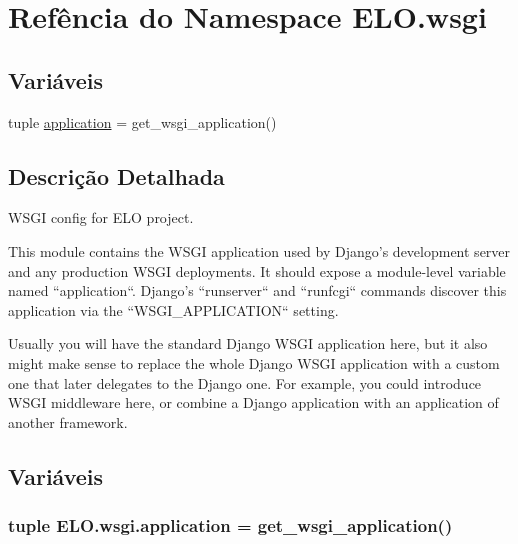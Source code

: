 \hypertarget{namespaceELO_1_1wsgi}{\section{Refência do Namespace E\-L\-O.\-wsgi}
\label{d9/d53/namespaceELO_1_1wsgi}
}
\subsection*{Variáveis}
\begin{DoxyCompactItemize}
\item 
tuple \hyperlink{namespaceELO_1_1wsgi_a8951c4ea2920440aeeb73c65ab517a5d}{application} = get\-\_\-wsgi\-\_\-application()
\end{DoxyCompactItemize}


\subsection{Descrição Detalhada}
\begin{DoxyVerb}WSGI config for ELO project.

This module contains the WSGI application used by Django's development server
and any production WSGI deployments. It should expose a module-level variable
named ``application``. Django's ``runserver`` and ``runfcgi`` commands discover
this application via the ``WSGI_APPLICATION`` setting.

Usually you will have the standard Django WSGI application here, but it also
might make sense to replace the whole Django WSGI application with a custom one
that later delegates to the Django one. For example, you could introduce WSGI
middleware here, or combine a Django application with an application of another
framework.\end{DoxyVerb}
 

\subsection{Variáveis}
\hypertarget{namespaceELO_1_1wsgi_a8951c4ea2920440aeeb73c65ab517a5d}{
\subsubsection[{application}]{\setlength{\rightskip}{0pt plus 5cm}tuple E\-L\-O.\-wsgi.\-application = get\-\_\-wsgi\-\_\-application()}}\label{d9/d53/namespaceELO_1_1wsgi_a8951c4ea2920440aeeb73c65ab517a5d}
